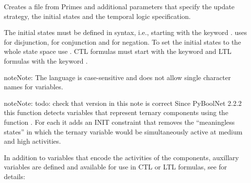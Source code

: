 \documentclass[letterpaper,10pt,english]{sphinxmanual}
\begin{document}
\begin{fulllineitems}
\label{\detokenize{ModelChecking:PyBoolNet.ModelChecking.primes2smv}}
Creates a  file from Primes and additional parameters that specify the update strategy, the initial states and the temporal logic specification.

The initial states must be defined in {\hyperref[\detokenize{Installation:installation-nusmv}]{}} syntax, i.e.,
starting with the keyword .
{\hyperref[\detokenize{Installation:installation-nusmv}]{}} uses \sphinxstyleemphasis{\textbar{}} for disjunction, \sphinxstyleemphasis{\&} for conjunction and \sphinxstyleemphasis{!} for negation.
To set the initial states to the whole state space use .
CTL formulas must start with the keyword  and LTL formulas with the keyword .

\begin{sphinxadmonition}{note}{Note:}
The {\hyperref[\detokenize{Installation:installation-nusmv}]{}} language is case-sensitive and does not allow single character names for variables.
\end{sphinxadmonition}

\begin{sphinxadmonition}{note}{Note:}
todo: check that version in this note is correct
Since PyBoolNet 2.2.2 this function detects variables that represent ternary components using the function
{\hyperref[\detokenize{PrimeImplicants:find-vanham-variables}]{}}.
For each it adds an INIT constraint that removes the “meaningless states” in which the ternary variable would be
simultaneously active at medium and high activities.
\end{sphinxadmonition}

In addition to variables that encode the activities of the components,
auxillary variables are defined and available for use in CTL or LTL formulas,
see {\hyperref[\detokenize{Manual:sec-model-checking}]{}} for details:


\end{fulllineitems}
\end{document}
